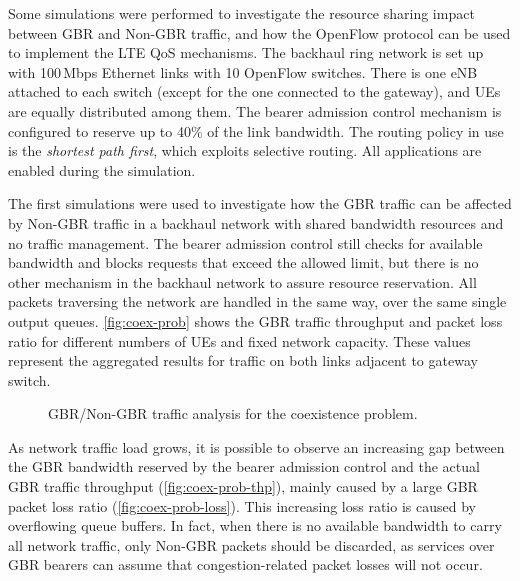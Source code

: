 Some simulations were performed to investigate the resource sharing impact
between \ac{GBR} and Non-\ac{GBR} traffic, and how the OpenFlow protocol can be
used to implement the \ac{LTE} \ac{QoS} mechanisms. The backhaul ring network
is set up with 100\,Mbps Ethernet links with 10 OpenFlow switches. There is one
\ac{eNB} attached to each switch (except for the one connected to the gateway),
and \acp{UE} are equally distributed among them. The bearer admission control
mechanism is configured to reserve up to 40\% of the link bandwidth.  The
routing policy in use is the \emph{shortest path first}, which exploits
selective routing. All applications are enabled during the simulation.

The first simulations were used to investigate how the \ac{GBR} traffic can be
affected by Non-\ac{GBR} traffic in a backhaul network with shared bandwidth
resources and no traffic management. The bearer admission control still checks
for available bandwidth and blocks requests that exceed the allowed limit, but
there is no other mechanism in the backhaul network to assure resource
reservation. All packets traversing the network are handled in the same way,
over the same single output queues. \autoref{fig:coex-prob} shows the \ac{GBR}
traffic throughput and packet loss ratio for different numbers of \acp{UE} and
fixed network capacity. These values represent the aggregated results for
traffic on both links adjacent to gateway switch.

\begin{figure}[t!]
  \centering
  \hfil
  \caption{\acs{GBR}/Non-\acs{GBR} traffic analysis
           for the coexistence problem.}
  \label{fig:coex-prob}
\end{figure}

As network traffic load grows, it is possible to observe an increasing gap
between the \ac{GBR} bandwidth reserved by the bearer admission control and the
actual \ac{GBR} traffic throughput (\autoref{fig:coex-prob-thp}), mainly caused
by a large \ac{GBR} packet loss ratio (\autoref{fig:coex-prob-loss}). This
increasing loss ratio is caused by overflowing queue buffers. In fact, when
there is no available bandwidth to carry all network traffic, only Non-\ac{GBR}
packets should be discarded, as services over GBR bearers can assume that
congestion-related packet losses will not occur.

